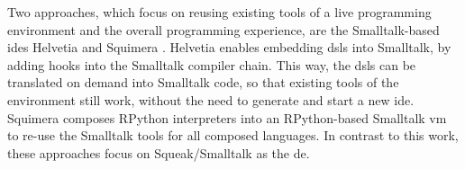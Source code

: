 \documentclass[sigplan,10pt,review,anonymous]{acmart}
\begin{document}
    
Two approaches, which focus on reusing existing tools of a live programming
environment and the overall programming experience, are the Smalltalk-based
\acp{ide} Helvetia \cite{renggli2010embedding} and Squimera
\cite{niephaus2018live}. Helvetia enables embedding \acp{dsl} into Smalltalk, by
adding hooks into the Smalltalk compiler chain. This way, the \acp{dsl} can be
translated on demand into Smalltalk code, so that existing tools of the
environment still work, without the need to generate and start a new
\ac{ide}. Squimera composes RPython interpreters into an RPython-based Smalltalk
\ac{vm} to re-use the Smalltalk tools for all composed languages. In contrast to
this work, these approaches focus on Squeak/Smalltalk as the \ac{de}.


    
\end{document}
